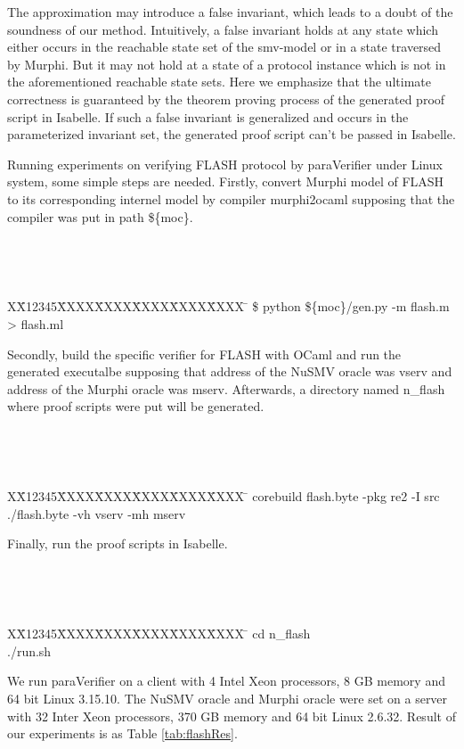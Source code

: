 \documentclass{llncs}
\newlength{\fminilength}
\newenvironment{fmini}[1][\linewidth]
  {\setlength{\fminilength}{#1\fboxsep-2\fboxrule}%
   \vspace{2ex}\noindent\begin{lrbox}{\fminibox}\begin{minipage}{\fminilength}%
   \mbox{ }\hfill\vspace{-2.5ex}}%
  {\end{minipage}\end{lrbox}\vspace{1ex}\hspace{0ex}%
   \framebox{\usebox{\fminibox}}}
\newenvironment{specification}
{\noindent\scriptsize
\tt\begin{fmini}\begin{tabbing}X\=X12345\=XXXX\=XXXX\=XXXX\=XXXX\=XXXX
\=\+\kill} {\end{tabbing}\normalfont\end{fmini}}
\begin{document}
 The approximation may introduce a false invariant, which leads to a doubt of the soundness of our method.  Intuitively, a  false invariant holds at any   state which either occurs in the reachable state set of the smv-model or in a state traversed by Murphi. But it may not hold at a state of a protocol instance which is not in the aforementioned reachable state sets. Here we emphasize that the ultimate correctness is guaranteed by the theorem proving process of the generated proof script in Isabelle. If such a false invariant is generalized and occurs in the parameterized invariant set, the generated proof script can't be passed in Isabelle.

Running experiments on verifying FLASH protocol by {\sf paraVerifier} under Linux system, some simple steps are needed. Firstly, convert Murphi model of FLASH to its corresponding internel model by compiler {\sf murphi2ocaml} supposing that the compiler was put in path {\sf\$\{moc\}}.

\begin{specification}
  \$ python \$\{moc\}/gen.py -m flash.m > flash.ml
\end{specification}

Secondly, build the specific verifier for FLASH with OCaml and run the generated executalbe supposing that address of the NuSMV oracle was {\sf vserv} and address of the Murphi oracle was {\sf mserv}. Afterwards, a directory named {\sf n\_flash} where proof scripts were put will be generated.

\begin{specification}
  corebuild flash.byte -pkg re2 -I src\\
  ./flash.byte -vh vserv -mh mserv
\end{specification}

Finally, run the proof scripts in Isabelle.

\begin{specification}
  cd n\_flash\\
  ./run.sh
\end{specification}

We run {\sf paraVerifier} on a client with 4 Intel Xeon processors, 8 GB memory and 64 bit Linux 3.15.10. The NuSMV oracle and Murphi oracle were set on a server with 32 Inter Xeon processors, 370 GB memory and 64 bit Linux 2.6.32. Result of our experiments is as Table \ref{tab:flashRes}.
\end{document}
